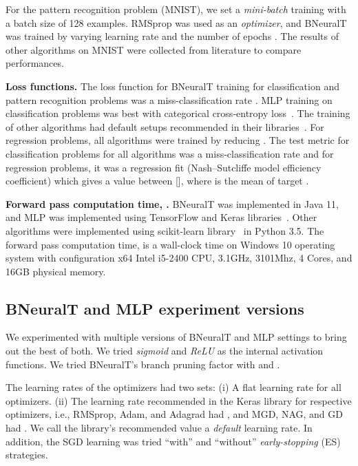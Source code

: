 \documentclass[11pt,a4paper]{article}
\begin{document}
    For the pattern recognition problem (MNIST), we set a  \textit{mini-batch} training with a batch size of 128 examples. RMSprop was used as an \textit{optimizer}, and BNeuralT was trained by varying learning rate  and the number of epochs . The results of other algorithms on MNIST were collected from literature to compare performances.
    
    \textbf{Loss functions.}
    The loss function for BNeuralT training for classification and pattern recognition problems was a miss-classification rate . MLP training on classification problems was best with categorical cross-entropy loss~\citep{bishop2006pattern}. The training of other algorithms had default setups recommended in their libraries~\citep{pedregosa2011scikit}. For regression problems, all algorithms were trained by reducing  . 
The test metric for classification problems for all algorithms was a miss-classification rate  and for regression problems, it was a regression fit  (Nash–Sutcliffe model efficiency coefficient) which gives a value between [], where  is the mean of target .
    
    \textbf{Forward pass computation time, .} BNeuralT was implemented in Java 11, and MLP was implemented using TensorFlow and Keras libraries~\citep{kerasSequential}. Other algorithms were implemented using scikit-learn library~\citep{pedregosa2011scikit} in Python 3.5. The forward pass computation time,  is a wall-clock time on Windows 10 operating system with configuration x64 Intel i5-2400 CPU, 3.1GHz, 3101Mhz, 4 Cores, and 16GB physical memory.
    
    \subsection{BNeuralT and MLP experiment versions}
    \label{sec:exp_version}
    We experimented with multiple versions of BNeuralT and MLP settings to bring out the best of both. We tried \textit{sigmoid} and \textit{ReLU} as the internal activation functions. We tried BNeuralT's branch pruning factor  with  and . 
    
    The learning rates of the optimizers had two sets: (i) A flat learning rate  for all optimizers. (ii) The learning rate recommended in the Keras library for respective optimizers, i.e., RMSprop, Adam, and Adagrad had , and MGD, NAG, and GD had  . We call the library's recommended  value a \textit{default} learning rate. In addition, the SGD learning was tried ``with'' and ``without'' \textit{early-stopping} (ES) strategies.
    
\end{document}
